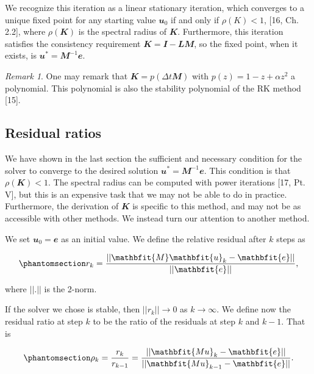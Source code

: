 \documentclass[
  letterpaper,
]{report}
\theoremstyle{definition}
\theoremstyle{plain}
\theoremstyle{definition}
\theoremstyle{remark}
\newtheorem*{remark}{Remark}
\begin{document}
We recognize this iteration as a linear stationary iteration, which
converges to a unique fixed point for any starting value
\(\mathbfit{u}_0\) if and only if \(\rho(K)<1\), {[}16, Ch. 2.2{]},
where \(\rho(\mathbfit{K})\) is the spectral radius of \(\mathbfit{K}\).
Furthermore, this iteration satisfies the consistency requirement
\(\mathbfit{K} = \mathbfit{I}-\mathbfit{LM}\), so the fixed point, when
it exists, is \(\mathbfit{u}^* = \mathbfit{M}^{-1}\mathbfit{e}\).

\begin{remark}
One may remark that \(\mathbfit{K} = p(\Delta t \mathbfit{M})\) with
\(p(z) = 1- z + \alpha z^2\) a polynomial. This polynomial is also the
stability polynomial of the RK method {[}15{]}.
\end{remark}

\subsection{Residual ratios}\label{residual-ratios}

We have shown in the last section the sufficient and necessary condition
for the solver to converge to the desired solution
\(\mathbfit{u}^* = \mathbfit{M}^{-1}\mathbfit{e}\). This condition is
that \(\rho(\mathbfit{K})<1\). The spectral radius can be computed with
power iterations {[}17, Pt. V{]}, but this is an expensive task that we
may not be able to do in practice. Furthermore, the derivation of
\(\mathbfit{K}\) is specific to this method, and may not be as
accessible with other methods. We instead turn our attention to another
method.

We set \(\mathbfit{u}_0 = \mathbfit{e}\) as an initial value. We define
the relative residual after \(k\) steps as

\begin{equation}\phantomsection\label{eq-relative_residual}{
r_k = \frac{||\mathbfit{M}\mathbfit{u}_k - \mathbfit{e}||}{||\mathbfit{e}||},
}\end{equation}

where \(||.||\) is the 2-norm.

If the solver we chose is stable, then \(||r_k|| \to 0\) as
\(k \to \infty\). We define now the residual ratio at step \(k\) to be
the ratio of the residuals at step \(k\) and \(k-1\). That is

\begin{equation}\phantomsection\label{eq-residual_ratio_equation}{
\rho_k = \frac{r_k}{r_{k-1}} = \frac{||\mathbfit{Mu}_k - \mathbfit{e}||}{||\mathbfit{Mu}_{k-1}-\mathbfit{e}||}.
}\end{equation}
\end{document}
